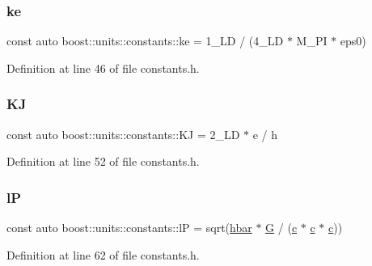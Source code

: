\subsubsection{\texorpdfstring{ke}{ke}}
{\footnotesize\ttfamily const auto boost\+::units\+::constants\+::ke = 1\+\_\+\+L\+D / (4\+\_\+\+L\+D $\ast$ M\+\_\+\+P\+I $\ast$ eps0)}



Definition at line 46 of file constants.\+h.

\hypertarget{namespaceboost_1_1units_1_1constants_ae34f25e7b4d627e972b71245bb24d861}{}\label{namespaceboost_1_1units_1_1constants_ae34f25e7b4d627e972b71245bb24d861} 
\subsubsection{\texorpdfstring{KJ}{KJ}}
{\footnotesize\ttfamily const auto boost\+::units\+::constants\+::\+KJ = 2\+\_\+\+L\+D $\ast$ e / h}



Definition at line 52 of file constants.\+h.

\hypertarget{namespaceboost_1_1units_1_1constants_a407b4793981496e04b1cdc536b91c565}{}\label{namespaceboost_1_1units_1_1constants_a407b4793981496e04b1cdc536b91c565} 
\subsubsection{\texorpdfstring{lP}{lP}}
{\footnotesize\ttfamily const auto boost\+::units\+::constants\+::lP = sqrt(\hyperlink{namespaceboost_1_1units_1_1constants_a0203c96d139e639b8ee536cbc010c7bd}{hbar} $\ast$ \hyperlink{namespaceboost_1_1units_1_1constants_abeab95597a02e0f0bccbd005fd8cb968}{G} / (\hyperlink{namespaceboost_1_1units_1_1constants_a1e4c07de84b2d43e7717eaada50b32de}{c} $\ast$ \hyperlink{namespaceboost_1_1units_1_1constants_a1e4c07de84b2d43e7717eaada50b32de}{c} $\ast$ \hyperlink{namespaceboost_1_1units_1_1constants_a1e4c07de84b2d43e7717eaada50b32de}{c}))}



Definition at line 62 of file constants.\+h.

\hypertarget{namespaceboost_1_1units_1_1constants_a14415c6082722a7b15c191a15f513b40}{}\label{namespaceboost_1_1units_1_1constants_a14415c6082722a7b15c191a15f513b40} 
